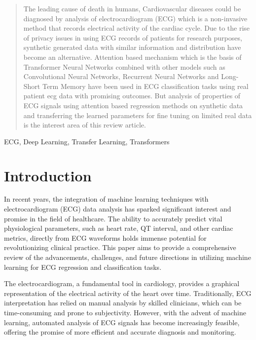 \documentclass[conference]{IEEEtran}
\begin{document}
\begin{abstract}
The leading cause of death in humans, Cardiovascular diseases\cite{b10} could be diagnosed by analysis of electrocardiogram (ECG) which is a non-invasive method that records electrical activity of the cardiac cycle. Due to the rise of privacy issues in using ECG records of patients for research purposes\cite{b1}, synthetic generated data with similar information and distribution have become an alternative. Attention based mechanism which is the basis of Transformer Neural Networks combined with other models such as Convolutional Neural Networks, Recurrent Neural Networks and Long-Short Term Memory have been used in ECG classification tasks using real patient ecg data with promising outcomes. But analysis of properties of ECG signals using attention based regression methods on synthetic data and transferring the learned parameters for fine tuning on limited real data is the interest area of this review article.

\end{abstract}

\begin{IEEEkeywords}
ECG, Deep Learning, Transfer Learning, Transformers
\end{IEEEkeywords}

\section{Introduction}
In recent years, the integration of machine learning techniques with electrocardiogram (ECG) data analysis has sparked significant interest and promise in the field of healthcare. The ability to accurately predict vital physiological parameters, such as heart rate, QT interval, and other cardiac metrics, directly from ECG waveforms holds immense potential for revolutionizing clinical practice. This paper aims to provide a comprehensive review of the advancements, challenges, and future directions in utilizing machine learning for ECG regression and classification tasks.

The electrocardiogram, a fundamental tool in cardiology, provides a graphical representation of the electrical activity of the heart over time. Traditionally, ECG interpretation has relied on manual analysis by skilled clinicians, which can be time-consuming and prone to subjectivity. However, with the advent of machine learning, automated analysis of ECG signals has become increasingly feasible, offering the promise of more efficient and accurate diagnosis and monitoring.
\end{document}
